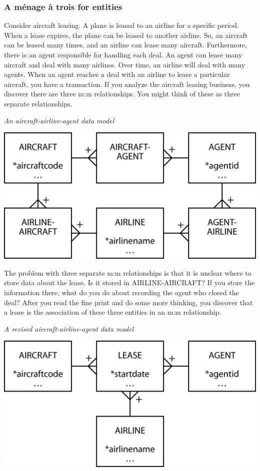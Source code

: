 \documentclass[
]{article}
\begin{document}
\hypertarget{a-muxe9nage-uxe0-trois-for-entities}{%
\subsubsection*{A ménage à trois for entities}\label{a-muxe9nage-uxe0-trois-for-entities}}

Consider aircraft leasing. A plane is leased to an airline for a
specific period. When a lease expires, the plane can be leased to
another airline. So, an aircraft can be leased many times, and an
airline can lease many aircraft. Furthermore, there is an agent
responsible for handling each deal. An agent can lease many aircraft and
deal with many airlines. Over time, an airline will deal with many
agents. When an agent reaches a deal with an airline to lease a
particular aircraft, you have a transaction. If you analyze the aircraft
leasing business, you discover there are three m:m relationships. You
might think of these as three separate relationships.

\emph{An aircraft-airline-agent data model}

\includegraphics{Figures/Chapter 7/airline.png}

The problem with three separate m:m relationships is that it is unclear
where to store data about the lease. Is it stored in AIRLINE-AIRCRAFT?
If you store the information there, what do you do about recording the
agent who closed the deal? After you read the fine print and do some
more thinking, you discover that a lease is the association of these
three entities in an m:m relationship.

\emph{A revised aircraft-airline-agent data model}

\includegraphics{Figures/Chapter 7/airline revised.png}
\end{document}
